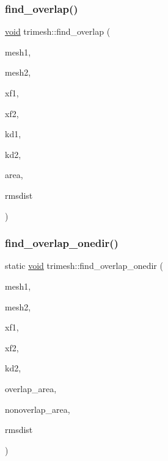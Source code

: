 \subsubsection{\texorpdfstring{find\+\_\+overlap()}{find\_overlap()}\hspace{0.1cm}{\footnotesize\ttfamily [3/3]}}
{\footnotesize\ttfamily \hyperlink{namespacetrimesh_a784ddfd979e1c579bda795a8edfc3f43}{void} trimesh\+::find\+\_\+overlap (\begin{DoxyParamCaption}\item[{\hyperlink{classtrimesh_1_1TriMesh}{Tri\+Mesh} $\ast$}]{mesh1,  }\item[{\hyperlink{classtrimesh_1_1TriMesh}{Tri\+Mesh} $\ast$}]{mesh2,  }\item[{const \hyperlink{namespacetrimesh_ad504958f2f56e393991b848986a8459f}{xform} \&}]{xf1,  }\item[{const \hyperlink{namespacetrimesh_ad504958f2f56e393991b848986a8459f}{xform} \&}]{xf2,  }\item[{const \hyperlink{classtrimesh_1_1KDtree}{K\+Dtree} $\ast$}]{kd1,  }\item[{const \hyperlink{classtrimesh_1_1KDtree}{K\+Dtree} $\ast$}]{kd2,  }\item[{float \&}]{area,  }\item[{float \&}]{rmsdist }\end{DoxyParamCaption})}

\mbox{\label{namespacetrimesh_a5b107dfa3240a61b07e0440e86253711}} 
\subsubsection{\texorpdfstring{find\+\_\+overlap\+\_\+onedir()}{find\_overlap\_onedir()}}
{\footnotesize\ttfamily static \hyperlink{namespacetrimesh_a784ddfd979e1c579bda795a8edfc3f43}{void} trimesh\+::find\+\_\+overlap\+\_\+onedir (\begin{DoxyParamCaption}\item[{\hyperlink{classtrimesh_1_1TriMesh}{Tri\+Mesh} $\ast$}]{mesh1,  }\item[{\hyperlink{classtrimesh_1_1TriMesh}{Tri\+Mesh} $\ast$}]{mesh2,  }\item[{const \hyperlink{namespacetrimesh_ad504958f2f56e393991b848986a8459f}{xform} \&}]{xf1,  }\item[{const \hyperlink{namespacetrimesh_ad504958f2f56e393991b848986a8459f}{xform} \&}]{xf2,  }\item[{const \hyperlink{classtrimesh_1_1KDtree}{K\+Dtree} $\ast$}]{kd2,  }\item[{float \&}]{overlap\+\_\+area,  }\item[{float \&}]{nonoverlap\+\_\+area,  }\item[{float \&}]{rmsdist }\end{DoxyParamCaption})\hspace{0.3cm}{\ttfamily [static]}}



